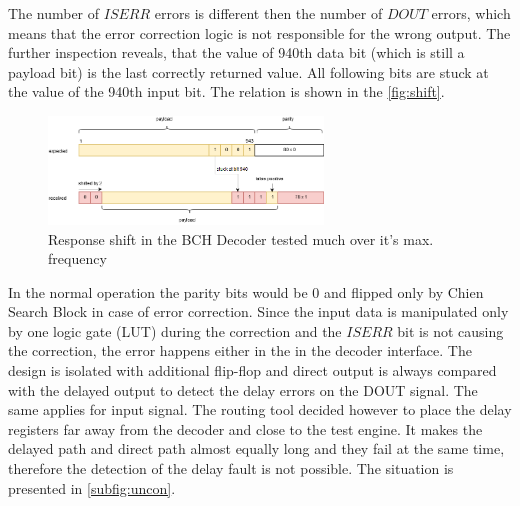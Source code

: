 The number of $ISERR$ errors is different then the number of $DOUT$ errors, which means that the error correction logic is not responsible for the wrong output. The further inspection reveals, that the value of 940th data bit (which is still a payload bit) is the last correctly returned value. All following bits are stuck at the value of the 940th input bit. The relation is shown in the \autoref{fig:shift}.

\begin{figure}[h]
\centering
\includegraphics[width=0.65\textwidth]{figures/decoder_parity.png}
\caption{Response shift in the BCH Decoder tested much over it's max. frequency}
\label{fig:shift}
\end{figure}

In the normal operation the parity bits would be 0 and flipped only by Chien Search Block in case of error correction. Since the input data is manipulated only by one logic gate (LUT) during the correction and the $ISERR$ bit is not causing the correction, the error happens either in the in the decoder interface. The design is isolated with additional flip-flop and direct output is always compared with the delayed output to detect the delay errors on the DOUT signal. The same applies for input signal. The routing tool decided however to place the delay registers far away from the decoder and close to the test engine. It makes the delayed path and direct path almost equally long and they fail at the same time, therefore the detection of the delay fault is not possible. The situation is presented in \autoref{subfig:uncon}.


